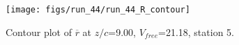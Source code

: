 \begin{figure}[H]
\centering
\texttt{[image: figs/run\_44/run\_44\_R\_contour]}
\caption{Contour plot of $\overline{r}$ at $z/c$=9.00, $V_{free}$=21.18, station 5.}
\label{fig:run_44_R_contour}
\end{figure}


